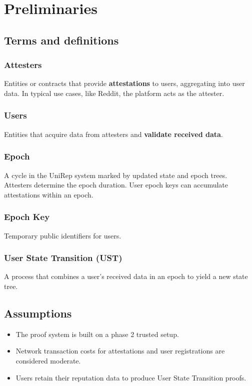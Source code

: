 \documentclass[11pt]{article}
\begin{document}
\section{Preliminaries}
\label{sec:org8c28449}

\subsection{Terms and definitions}
\label{sec:org557344a}

\subsubsection{Attesters}
\label{sec:org14fd23c}
Entities or contracts that provide \textbf{\textbf{attestations}} to users, aggregating into user data. In typical use cases, like Reddit, the platform acts as the attester.
\subsubsection{Users}
\label{sec:org2da00a7}
Entities that acquire data from attesters and \textbf{\textbf{validate received data}}.
\subsubsection{Epoch}
\label{sec:org7a1b4ef}
A cycle in the UniRep system marked by updated state and epoch trees. Attesters determine the epoch duration. User epoch keys can accumulate attestations within an epoch.
\subsubsection{Epoch Key}
\label{sec:org0bf2214}
Temporary public identifiers for users.
\subsubsection{User State Transition (UST)}
\label{sec:org5603e27}
A process that combines a user's received data in an epoch to yield a new state tree.
\subsection{Assumptions}
\label{sec:orgbb1956d}
\begin{itemize}
\item The proof system is built on a phase 2 trusted setup.
\item Network transaction costs for attestations and user registrations are considered moderate.
\item Users retain their reputation data to produce User State Transition proofs.
\end{itemize}
\end{document}
